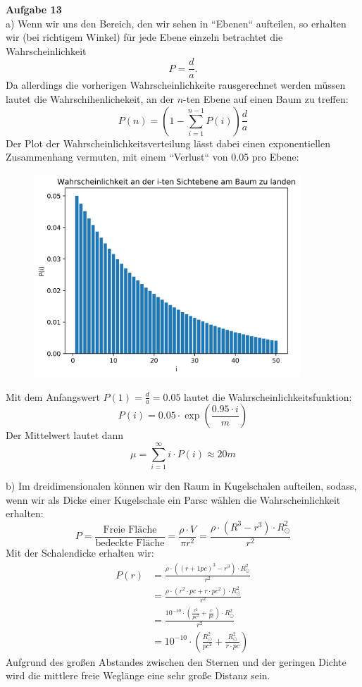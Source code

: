 \documentclass[11pt, a4paper]{article}
\begin{document}
\thispagestyle{fancy}
\noindent
{\large\textbf{Aufgabe 13}} \\[0.2cm]
a) Wenn wir uns den Bereich, den wir sehen in ``Ebenen`` aufteilen, so erhalten wir (bei richtigem 
Winkel) für jede Ebene einzeln betrachtet die Wahrscheinlichkeit
\[ P = \frac da. \]
Da allerdings die vorherigen Wahrscheinlichkeite rausgerechnet werden müssen lautet die 
Wahrschihenlichekeit, an der $n$-ten Ebene auf einen Baum zu treffen:
\[
	P(n) = \left(1 - \sum_{i = 1}^{n-1} P(i) \right) \frac da 
\]
Der Plot der Wahrscheinlichkeitsverteilung lässt dabei einen exponentiellen Zusammenhang vermuten, mit
einem ``Verlust`` von 0.05 pro Ebene:
\begin{figure}[H]
	\centering
	\includegraphics[width=10cm]{13.png}
\end{figure}
Mit dem Anfangswert $P(1) = \frac da = 0.05$ lautet die Wahrscheinlichkeitsfunktion:
\[
	P(i) = 0.05 \cdot \exp\left( \frac{0.95 \cdot i}{m}\right)
\]
Der Mittelwert lautet dann
\[
	\mu = \sum_{i=1}^\infty i \cdot P(i) \approx 20m
\]

\newpage
\setlength{\headheight}{0cm}

b)
Im dreidimensionalen können wir den Raum in Kugelschalen aufteilen, sodass, wenn wir als Dicke einer 
Kugelschale ein Parsc wählen die Wahrscheinlichkeit erhalten:
\[
	P = \frac{\text{Freie Fläche}}{\text{bedeckte Fläche}} = \frac{\rho \cdot V}{\pi r^2}
	=\frac{\rho \cdot \left(R^3 - r^3\right) \cdot R_\odot^2}{r^2}
\]
Mit der Schalendicke erhalten wir:
\begin{align*}
	P(r) 
	&= \frac{\rho \cdot \left( (r+ 1pc)^3 - r^3 \right) \cdot R_\odot^2}{r^2} \\
	&= \frac{\rho \cdot \left( r^2 \cdot pc + r \cdot pc^2 \right) \cdot R_\odot^2}{r^2} \\
	&= \frac{10^{-10} \cdot \left( \frac{r^2}{pc^2} + \frac{r}{pc} \right) \cdot R_\odot^2}{r^2} \\
	&= 10^{-10} \cdot \left( \frac{R_\odot^2}{pc^2} + \frac{R_\odot^2}{r \cdot pc} \right)
\end{align*}
Aufgrund des großen Abstandes zwischen den Sternen und der geringen Dichte wird die mittlere freie 
Weglänge eine sehr große Distanz sein.
\end{document}
